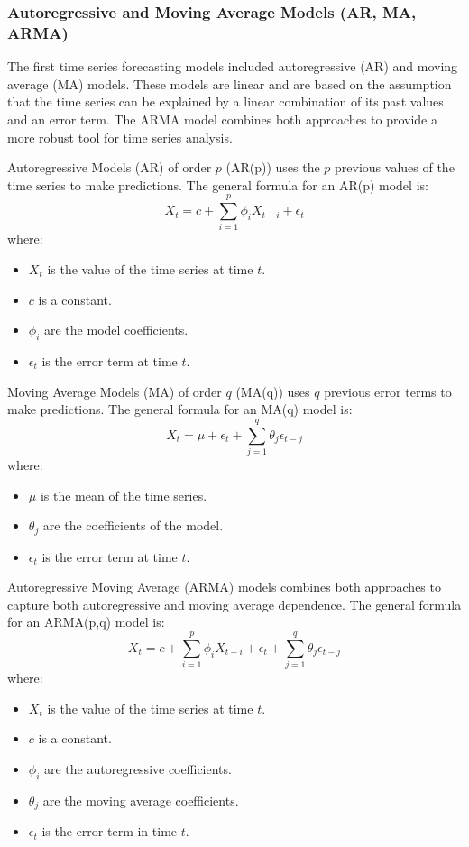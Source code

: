 \subsubsection{Autoregressive and Moving Average Models (AR, MA, ARMA)}

The first time series forecasting models included autoregressive (AR) and moving average (MA) models. These models are linear and are based on the assumption that the time series can be explained by a linear combination of its past values and an error term. The ARMA model combines both approaches to provide a more robust tool for time series analysis.

Autoregressive Models (AR) of order \( p \) (AR(p)) uses the \( p \) previous values of the time series to make predictions. The general formula for an AR(p) model is:
\[
X_t = c + \sum_{i=1}^{p} \phi_i X_{t-i} + \epsilon_t
\]
where:
\begin{itemize}
    \item \( X_t \) is the value of the time series at time \( t \).
    \item \( c \) is a constant.
    \item \( \phi_i \) are the model coefficients.
    \item \( \epsilon_t \) is the error term at time \( t \).
\end{itemize}

Moving Average Models (MA) of order \( q \) (MA(q)) uses \( q \) previous error terms to make predictions. The general formula for an MA(q) model is:
\[
X_t = \mu + \epsilon_t + \sum_{j=1}^{q} \theta_j \epsilon_{t-j}
\]
where:
\begin{itemize}
    \item \( \mu \) is the mean of the time series.
    \item \( \theta_j \) are the coefficients of the model.
    \item \( \epsilon_t \) is the error term at time \( t \).
\end{itemize}

Autoregressive Moving Average (ARMA) models combines both approaches to capture both autoregressive and moving average dependence. The general formula for an ARMA(p,q) model is:
\[
X_t = c + \sum_{i=1}^{p} \phi_i X_{t-i} + \epsilon_t + \sum_{j=1}^{q} \theta_j \epsilon_{t-j}
\]
where:
\begin{itemize}
    \item \( X_t \) is the value of the time series at time \( t \).
    \item \( c \) is a constant.
    \item \( \phi_i \) are the autoregressive coefficients.
    \item \( \theta_j \) are the moving average coefficients.
    \item \( \epsilon_t \) is the error term in time \( t \).
\end{itemize}
\vspace{10pt}

